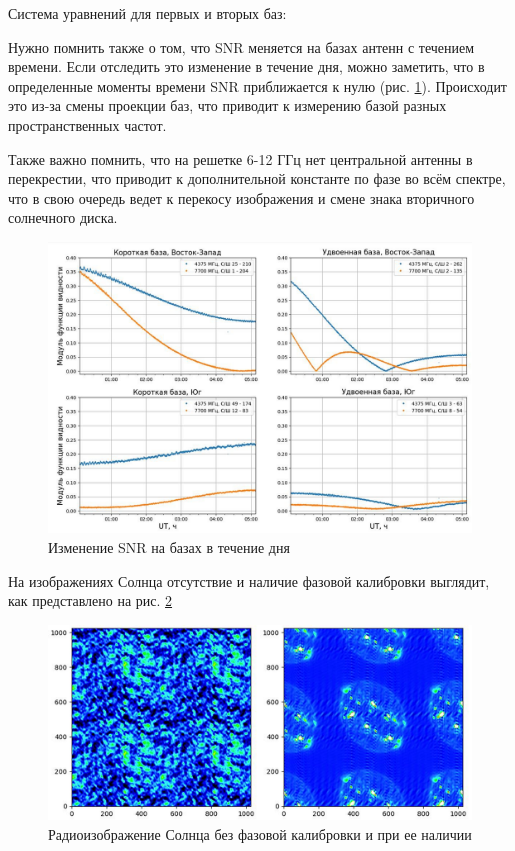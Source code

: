 Система уравнений для первых и вторых баз:


Нужно помнить также о том, что SNR меняется на базах антенн с течением времени. Если отследить это изменение в течение дня, можно заметить, что в определенные моменты времени SNR приближается к нулю (рис. \ref{fig:SNRonbase}). Происходит это из-за смены проекции баз, что приводит к измерению базой разных пространственных частот.

Также важно помнить, что на решетке 6-12 ГГц нет центральной антенны в перекрестии, что приводит к дополнительной константе по фазе во всём спектре, что в свою очередь ведет к перекосу изображения и смене знака вторичного солнечного диска.

\begin{figure}[H]
	\centering
	\includegraphics[scale=1]{images/SNRonbase.jpg}
	\caption{Изменение SNR на базах в течение дня}
	\label{fig:SNRonbase}
\end{figure}

На изображениях Солнца отсутствие и наличие фазовой калибровки выглядит, как представлено на рис. \ref{fig:notcalibandcalib}

\begin{figure}[H]
	\centering
	\includegraphics[width=1\linewidth]{images/notcalib_and_calib}
	\caption{Радиоизображение Солнца без фазовой калибровки и при ее наличии}
	\label{fig:notcalibandcalib}
\end{figure}

